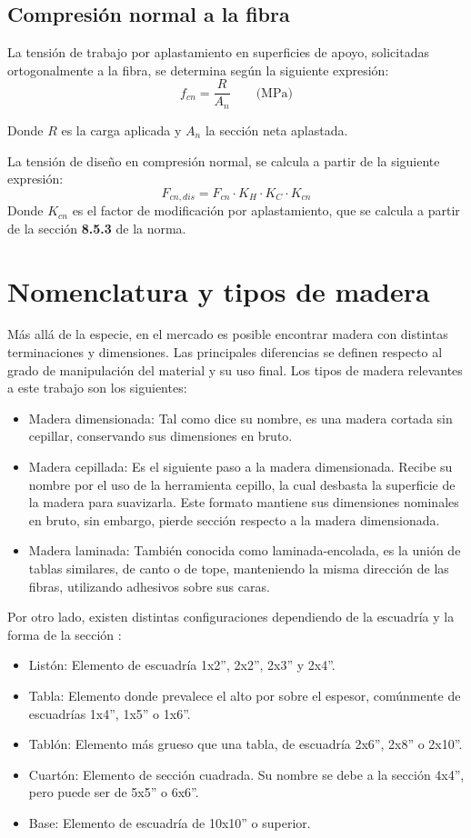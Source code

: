 \subsection{Compresión normal a la fibra}
La tensión de trabajo por aplastamiento en superficies de apoyo, solicitadas ortogonalmente a la fibra, se determina según la siguiente expresión:
\begin{equation}
	f_{cn}= \frac{R}{A_n} \qquad \text{(MPa)}
\end{equation}

Donde $R$ es la carga aplicada y $A_n$ la sección neta aplastada.

La tensión de diseño en compresión normal, se calcula a partir de la siguiente expresión:
\begin{equation}
	F_{cn,dis} = F_{cn} \cdot K_H \cdot K_C \cdot K_{cn}
\end{equation}
Donde $K_{cn}$ es el factor de modificación por aplastamiento, que se calcula a partir de la sección \textbf{8.5.3} de la norma.


\section{Nomenclatura y tipos de madera}
Más allá de la especie, en el mercado es posible encontrar madera con distintas terminaciones y dimensiones. Las principales diferencias se definen respecto al grado de manipulación del material y su uso final. Los tipos de madera relevantes a este trabajo son los siguientes:
\begin{itemize}
	\item Madera dimensionada: Tal como dice su nombre, es una madera cortada sin cepillar, conservando sus dimensiones en bruto.
	\item Madera cepillada: Es el siguiente paso a la madera dimensionada. Recibe su nombre por el uso de la herramienta cepillo, la cual desbasta la superficie de la madera para suavizarla. Este formato mantiene sus dimensiones nominales en bruto, sin embargo, pierde sección respecto a la madera dimensionada.
	\item Madera laminada: También conocida como laminada-encolada, es la unión de tablas similares, de canto o de tope, manteniendo la misma dirección de las fibras, utilizando adhesivos sobre sus caras.
\end{itemize}

Por otro lado, existen distintas configuraciones dependiendo de la escuadría y la forma de la sección \cite{sistemasconstructivos}:
\begin{itemize}
	\item Listón: Elemento de escuadría 1x2'', 2x2'', 2x3'' y 2x4''.
	\item Tabla: Elemento donde prevalece el alto por sobre el espesor, comúnmente de escuadrías 1x4'', 1x5'' o 1x6''.
	\item Tablón: Elemento más grueso que una tabla, de escuadría 2x6'', 2x8'' o 2x10''.
	\item Cuartón: Elemento de sección cuadrada. Su nombre se debe a la sección 4x4'', pero puede ser de 5x5'' o 6x6''.
	\item Base: Elemento de escuadría de 10x10'' o superior. 
\end{itemize}

